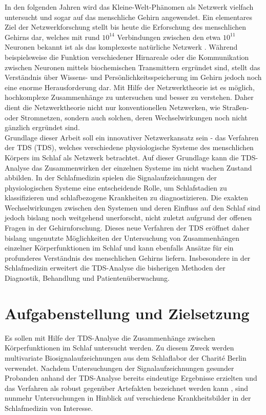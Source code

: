 In den folgenden Jahren wird das Kleine-Welt-Phänomen als Netzwerk vielfach untersucht und sogar auf das menschliche Gehirn angewendet. Ein elementares Ziel der Netzwerkforschung stellt bis heute die Erforschung des menschlichen Gehirns dar, welches mit rund $10^{14}$ Verbindungen zwischen den etwa $10^{11}$ Neuronen bekannt ist als das komplexeste natürliche Netzwerk \parencite{ertel_grundkurs_2013}. Während beispielsweise die Funktion verschiedener Hirnareale oder die Kommunikation zwischen Neuronen mittels biochemischen Transmittern ergründet sind, stellt das Verständnis über Wissens- und Persönlichkeitsspeicherung im Gehirn jedoch noch eine enorme Herausforderung dar. Mit Hilfe der Netzwerktheorie ist es möglich, hochkomplexe Zusammenhänge zu untersuchen und besser zu verstehen. Daher dient die Netzwerktheorie nicht nur konventionellen Netzwerken, wie Straßen- oder Stromnetzen, sondern auch solchen, deren Wechselwirkungen noch nicht gänzlich ergründet sind. \parencite{lenzen_alles_2016}\\

Grundlage dieser Arbeit soll ein innovativer Netzwerkansatz sein - das Verfahren der \acl{TDS} (\acs{TDS}), welches verschiedene physiologische Systeme des menschlichen Körpers im Schlaf als Netzwerk betrachtet. Auf dieser Grundlage kann die \acs{TDS}-Analyse das Zusammenwirken der einzelnen Systeme im nicht wachen Zustand abbilden. In der Schlafmedizin spielen die Signalaufzeichnungen der physiologischen Systeme eine entscheidende Rolle, um Schlafstadien zu klassifizieren und schlafbezogene Krankheiten zu diagnostizieren. Die exakten Wechselwirkungen zwischen den Systemen und deren Einfluss auf den Schlaf sind jedoch bislang noch weitgehend unerforscht, nicht zuletzt aufgrund der offenen Fragen in der Gehirnforschung. Dieses neue Verfahren der \acs{TDS} eröffnet daher bislang ungenutzte Möglichkeiten der Untersuchung von Zusammenhängen einzelner Körperfunktionen im Schlaf und kann ebenfalls Ansätze für ein profunderes Verständnis des menschlichen Gehirns liefern. Insbesondere in der Schlafmedizin erweitert die \acs{TDS}-Analyse die bisherigen Methoden der Diagnostik, Behandlung und Patientenüberwachung. \parencite{bashan_network_2012, penzel_schlafstorungen_2005}

\section{Aufgabenstellung und Zielsetzung}

Es sollen mit Hilfe der \acs{TDS}-Analyse die Zusammenhänge zwischen Körperfunktionen im Schlaf untersucht werden. Zu diesem Zweck werden multivariate Biosignalaufzeichnungen aus dem Schlaflabor der Charité Berlin verwendet. Nachdem Untersuchungen der Signalaufzeichnungen gesunder Probanden anhand der \acs{TDS}-Analyse bereits eindeutige Ergebnisse erzielten \parencite{bashan_network_2012} und das Verfahren als robust gegenüber Artefakten bezeichnet werden kann \parencite{breuer_netzwerktopologie_2016}, sind nunmehr Untersuchungen in Hinblick auf verschiedene Krankheitsbilder in der Schlafmedizin von Interesse. 

